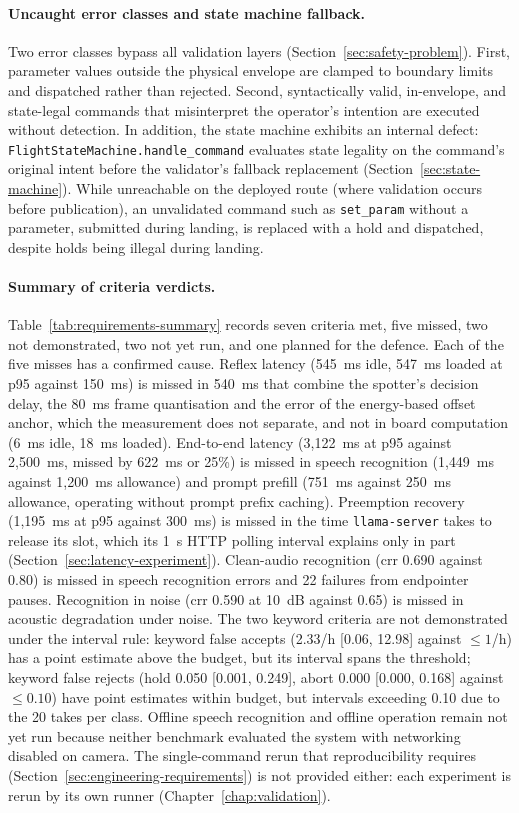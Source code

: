 \paragraph{Uncaught error classes and state machine fallback.} Two error classes bypass all validation
layers (Section~\ref{sec:safety-problem}). First, parameter values outside the physical envelope are
clamped to boundary limits and dispatched rather than rejected. Second, syntactically valid,
in-envelope, and state-legal commands that misinterpret the operator's intention are executed without
detection. In addition, the state machine exhibits an internal defect:
\texttt{FlightStateMachine.handle\_command} evaluates state legality on the command's original intent
before the validator's fallback replacement (Section~\ref{sec:state-machine}). While unreachable on the
deployed route (where validation occurs before publication), an unvalidated command such as
\texttt{set\_param} without a parameter, submitted during landing, is replaced with a hold and
dispatched, despite holds being illegal during landing.

\paragraph{Summary of criteria verdicts.} Table~\ref{tab:requirements-summary} records seven criteria
met, five missed, two not demonstrated, two not yet run, and one planned for the defence. Each of the
five misses has a confirmed cause. Reflex latency (545~ms idle, 547~ms loaded at p95 against 150~ms) is
missed in 540~ms that combine the spotter's decision delay, the 80~ms frame quantisation and the error of
the energy-based offset anchor, which the measurement does not separate, and not in board computation
(6~ms idle, 18~ms loaded). End-to-end latency (3{,}122~ms at p95 against 2{,}500~ms, missed by 622~ms or
25\%) is missed in speech recognition (1{,}449~ms against 1{,}200~ms allowance) and prompt prefill
(751~ms against 250~ms allowance, operating without prompt prefix caching). Preemption recovery
(1{,}195~ms at p95 against 300~ms) is missed in the time \texttt{llama-server} takes to
release its slot, which its 1~s HTTP polling interval explains only in part
(Section~\ref{sec:latency-experiment}). Clean-audio recognition (\gls{crr} 0.690 against 0.80) is missed in speech recognition
errors and 22 failures from endpointer pauses. Recognition in noise (\gls{crr} 0.590 at 10~dB against
0.65) is missed in acoustic degradation under noise. The two keyword criteria are not demonstrated under
the interval rule: keyword false accepts (2.33/h [0.06, 12.98] against $\leq 1$/h) has a point estimate
above the budget, but its interval spans the threshold; keyword false rejects (hold 0.050 [0.001, 0.249],
abort 0.000 [0.000, 0.168] against $\leq 0.10$) have point estimates within budget, but intervals
exceeding 0.10 due to the 20 takes per class. Offline speech recognition and offline operation remain not
yet run because neither benchmark evaluated the system with networking disabled on camera. The
single-command rerun that reproducibility requires (Section~\ref{sec:engineering-requirements}) is not
provided either: each experiment is rerun by its own runner (Chapter~\ref{chap:validation}).

